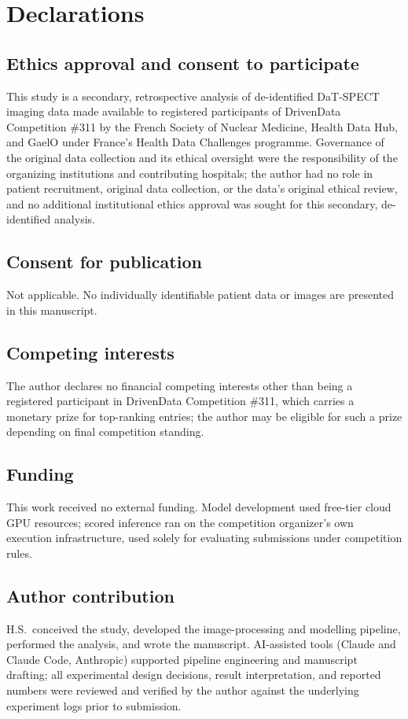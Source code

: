 \documentclass[11pt]{article}
\begin{document}
\bigskip
\section*{Declarations}

\subsection*{Ethics approval and consent to participate}
This study is a secondary, retrospective analysis of de-identified DaT-SPECT imaging data made available to registered participants of DrivenData Competition \#311 by the French Society of Nuclear Medicine, Health Data Hub, and GaelO under France's Health Data Challenges programme. Governance of the original data collection and its ethical oversight were the responsibility of the organizing institutions and contributing hospitals; the author had no role in patient recruitment, original data collection, or the data's original ethical review, and no additional institutional ethics approval was sought for this secondary, de-identified analysis.

\subsection*{Consent for publication}
Not applicable. No individually identifiable patient data or images are presented in this manuscript.

\subsection*{Competing interests}
The author declares no financial competing interests other than being a registered participant in DrivenData Competition \#311, which carries a monetary prize for top-ranking entries; the author may be eligible for such a prize depending on final competition standing.

\subsection*{Funding}
This work received no external funding. Model development used free-tier cloud GPU resources; scored inference ran on the competition organizer's own execution infrastructure, used solely for evaluating submissions under competition rules.

\subsection*{Author contribution}
H.S.\ conceived the study, developed the image-processing and modelling pipeline, performed the analysis, and wrote the manuscript. AI-assisted tools (Claude and Claude Code, Anthropic) supported pipeline engineering and manuscript drafting; all experimental design decisions, result interpretation, and reported numbers were reviewed and verified by the author against the underlying experiment logs prior to submission.
\end{document}
